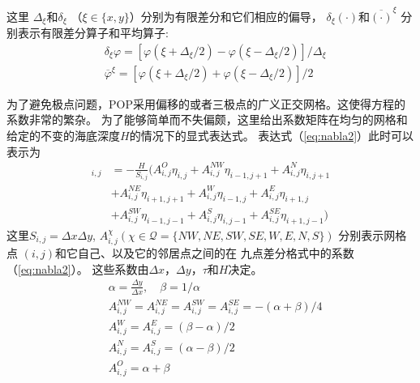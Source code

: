 这里 $\Delta_\xi$和$\delta_\xi$  （$\xi \in \{x, y\} $）分别为有限差分和它们相应的偏导， $\delta_\xi (\cdot) $和$\overline{(\cdot)}^\xi $ 分别表示有限差分算子和平均算子:  
\begin{align}
&\delta_\xi \varphi = [\varphi (\xi+\Delta_\xi/2) -\varphi(\xi-\Delta_\xi/2)]/\Delta_\xi \\
&\overline{\varphi}^\xi  =[\varphi (\xi+\Delta_\xi/2) +\varphi(\xi-\Delta_\xi/2)]/2
\end{align}
 
 

为了避免极点问题，POP采用偏移的或者三极点的广义正交网格。这使得方程的系数非常的繁杂。
为了能够简单而不失偏颇，这里给出系数矩阵在均匀的网格和给定的不变的海底深度$H$的情况下的显式表达式。
表达式（\ref{eq:nabla2}）此时可以表示为
\begin{align}
 [\nabla\cdot H \nabla \eta]_{i,j}&= -\frac{H}{S_{i,j}}(A_{i,j}^O\eta_{i,j}+A_{i,j}^{NW}\eta_{i-1,j+1}+A_{i,j}^N\eta_{i,j+1} \nonumber\\
 &+A_{i,j}^{NE}\eta_{i+1,j+1}+A_{i,j}^W\eta_{i-1,j} +A_{i,j}^E\eta_{i+1,j} \nonumber\\
& +A_{i,j}^{SW}\eta_{i-1,j-1} +A_{i,j}^S\eta_{i,j-1}+ A_{i,j}^{SE}\eta_{i+1,j-1})
\end{align}
这里$S_{i,j}  = \Delta x\Delta y$, $A_{i,j}^{\chi } ( \chi \in \mathcal{Q} = \{NW,NE, SW, SE, W, E, N, S\})$ 分别表示网格点 $(i,j)$和它自己、以及它的邻居点之间的在 九点差分格式中的系数（\ref{eq:nabla2}）。 这些系数由$\Delta x$，$\Delta y$，$\tau$和$H$决定。
\begin{equation} \label{defineA}
\begin{aligned}
&\alpha  = \frac{ \Delta y}{ \Delta x }, \quad \beta  = 1/\alpha \\
&A_{i,j}^{NW} = A_{i,j}^{NE} =A_{i,j}^{SW} = A_{i,j}^{SE} = - (\alpha  +  \beta  )/4 \\
&A_{i,j}^{W} = A_{i,j}^{E} = (  \beta  -\alpha  )/2 \\
&A_{i,j}^{N} = A_{i,j}^{S} = (\alpha  -\beta )/2 \\
&A_{i,j}^{O} =   \alpha   +\beta  \\
\end{aligned}
\end{equation}


